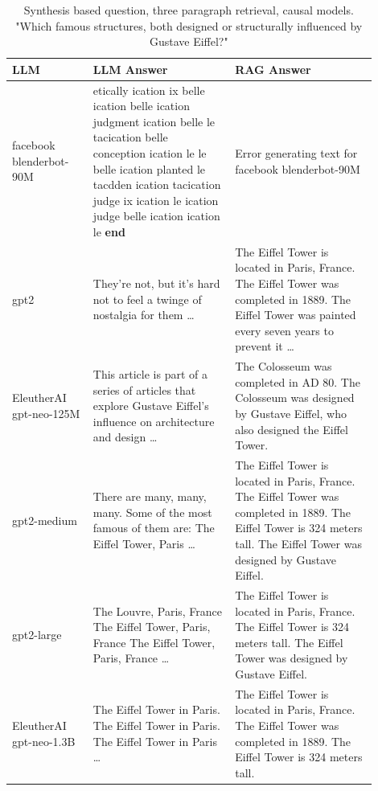 \documentclass{wseas}
\begin{document}
\begin{table}[htbp]
  \centering
  \caption{Synthesis based question, three paragraph retrieval, causal models. "Which famous structures, both designed or structurally influenced by Gustave Eiffel?"} %
  \label{tab:experiment_R_3_paragraph_Q_synthesis_M_casual_table}  %
  \begin{tabular}{|p{0.20\linewidth}|p{0.35\linewidth}|p{0.35\linewidth}|}
    \hline
    \textbf{LLM} & \textbf{LLM Answer} & \textbf{RAG Answer} \\
    \hline
    facebook blenderbot-90M & etically ication ix belle ication belle ication judgment ication belle le tacication belle conception ication le le belle ication planted le tacdden ication tacication judge ix ication le ication judge belle ication ication le \textbf{end} & Error generating text for facebook blenderbot-90M \\
    \hline
    gpt2 & They're not, but it's hard not to feel a twinge of nostalgia for them \ldots{} & The Eiffel Tower is located in Paris, France. The Eiffel Tower was completed in 1889. The Eiffel Tower was painted every seven years to prevent it \ldots{} \\
    \hline
    EleutherAI gpt-neo-125M & This article is part of a series of articles that explore Gustave Eiffel's influence on architecture and design \ldots{} & The Colosseum was completed in AD 80. The Colosseum was designed by Gustave Eiffel, who also designed the Eiffel Tower. \\
    \hline
    gpt2-medium & There are many, many, many. Some of the most famous of them are: The Eiffel Tower, Paris \ldots{} & The Eiffel Tower is located in Paris, France. The Eiffel Tower was completed in 1889. The Eiffel Tower is 324 meters tall. The Eiffel Tower was designed by Gustave Eiffel. \\
    \hline
    gpt2-large & The Louvre, Paris, France The Eiffel Tower, Paris, France The Eiffel Tower, Paris, France \ldots{} & The Eiffel Tower is located in Paris, France. The Eiffel Tower is 324 meters tall. The Eiffel Tower was designed by Gustave Eiffel. \\
    \hline
    EleutherAI gpt-neo-1.3B & The Eiffel Tower in Paris. The Eiffel Tower in Paris. The Eiffel Tower in Paris \ldots{} & The Eiffel Tower is located in Paris, France. The Eiffel Tower was completed in 1889. The Eiffel Tower is 324 meters tall. \\
    \hline
  \end{tabular}
\end{table}
\end{document}
